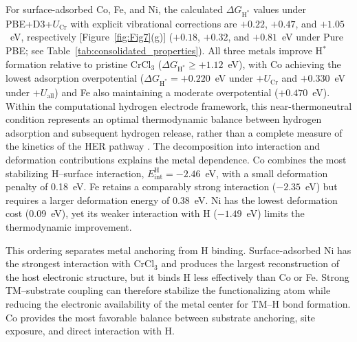 \documentclass[journal=jacsat,manuscript=article]{achemso}
\begin{document}
{\color{revcolor}%
  For surface-adsorbed Co, Fe, and Ni, the calculated $\Delta G_{\mathrm{H}^*}$ values under PBE+D3+$U_{\mathrm{Cr}}$ with explicit vibrational corrections are $+0.22$, $+0.47$, and $+1.05$~eV, respectively [Figure~\ref{fig:Fig7}(g)] ($+0.18$, $+0.32$, and $+0.81$~eV under Pure PBE; see Table~\ref{tab:consolidated_properties}). All three metals improve H$^*$ formation relative to pristine CrCl$_3$ ($\Delta G_{\mathrm{H}^*} \ge +1.12$~eV), with Co achieving the lowest adsorption overpotential ($\Delta G_{\mathrm{H}^*} = +0.220$~eV under $+U_{\mathrm{Cr}}$ and $+0.330$~eV under $+U_{\mathrm{all}}$) and Fe also maintaining a moderate overpotential ($+0.470$~eV). Within the computational hydrogen electrode framework, this near-thermoneutral condition represents an optimal thermodynamic balance between hydrogen adsorption and subsequent hydrogen release, rather than a complete measure of the kinetics of the HER pathway \cite{Norskov_2005,Liao2022}. The decomposition into interaction and deformation contributions explains the metal dependence. Co combines the most stabilizing H--surface interaction, $E_{\mathrm{int}}^{\mathrm H}=-2.46$~eV, with a small deformation penalty of 0.18~eV. Fe retains a comparably strong interaction ($-2.35$~eV) but requires a larger deformation energy of 0.38~eV. Ni has the lowest deformation cost (0.09~eV), yet its weaker interaction with H ($-1.49$~eV) limits the thermodynamic improvement.
\par}

This ordering separates metal anchoring from H binding. Surface-adsorbed Ni has the strongest interaction with CrCl$_3$ and produces the largest reconstruction of the host electronic structure, but it binds H less effectively than Co or Fe. Strong TM--substrate coupling can therefore stabilize the functionalizing atom while reducing the electronic availability of the metal center for TM--H bond formation. Co provides the most favorable balance between substrate anchoring, site exposure, and direct interaction with H.
\end{document}
